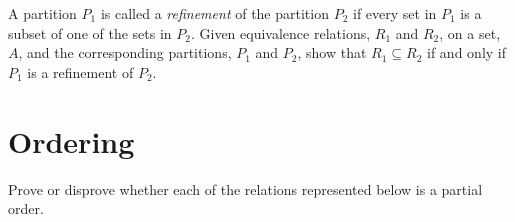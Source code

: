 \documentclass[addpoints]{exam}
\begin{document}
\begin{questions}
\begin{multicols}{2}
  \end{multicols}
  \begin{solution}
    \begin{parts}
    \part 
    \part 
    \end{parts}
  \end{solution}

\question[5] A partition $P_1$ is called a \textit{refinement} of the partition $P_2$ if every set in $P_1$ is a subset of one of the sets in $P_2$. Given equivalence relations, $R_1$ and $R_2$, on a set, $A$, and the corresponding partitions, $P_1$ and $P_2$, show that $R_1 \subseteq R_2$ if and only if $P_1$ is a refinement of $P_2$.
  \begin{solution}
  \end{solution}

\section{Ordering}
  
\question Prove or disprove whether each of the relations represented below is a partial order.
  \begin{multicols}{3}
  \end{multicols}
  \begin{solution}
    \begin{parts}

\end{parts}
\end{solution}
\end{questions}
\end{document}
